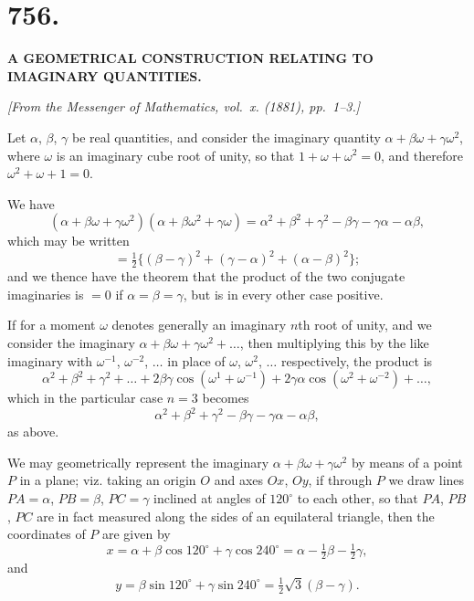 \documentclass[12pt,a4paper]{article}
\begin{document}
\newpage


\section*{756.}

\begin{center}
\textbf{A GEOMETRICAL CONSTRUCTION RELATING TO IMAGINARY QUANTITIES.}
\end{center}

\begin{flushright}
\textit{[From the Messenger of Mathematics, vol.~x. (1881), pp.~1--3.]}
\end{flushright}

Let $\alpha$, $\beta$, $\gamma$ be real quantities, and consider the imaginary quantity
$\alpha + \beta\omega + \gamma\omega^2$, where $\omega$ is an imaginary cube root of unity, so that
$1 + \omega + \omega^2 = 0$, and therefore $\omega^2 + \omega + 1 = 0$.

We have
%
\[
(\alpha + \beta\omega + \gamma\omega^2)
(\alpha + \beta\omega^2 + \gamma\omega)
= \alpha^2 + \beta^2 + \gamma^2 - \beta\gamma - \gamma\alpha - \alpha\beta,
\]
%
which may be written
%
\[
= \tfrac{1}{2} \{ (\beta-\gamma)^2 + (\gamma-\alpha)^2 + (\alpha-\beta)^2 \};
\]
%
and we thence have the theorem that the product of the two conjugate
imaginaries is $=0$ if $\alpha = \beta = \gamma$, but is in every other case positive.

If for a moment $\omega$ denotes generally an imaginary $n$th root of unity, and
we consider the imaginary $\alpha + \beta\omega + \gamma\omega^2 + \ldots$, then multiplying this by
the like imaginary with $\omega^{-1}$, $\omega^{-2}$, $\ldots$ in place of $\omega$, $\omega^2$, $\ldots$ respectively,
the product is
%
\[
\alpha^2 + \beta^2 + \gamma^2 + \ldots
+ 2\beta\gamma \cos(\omega^1 + \omega^{-1})
+ 2\gamma\alpha \cos(\omega^2 + \omega^{-2})
+ \ldots,
\]
%
which in the particular case $n=3$ becomes
%
\[
\alpha^2 + \beta^2 + \gamma^2 - \beta\gamma - \gamma\alpha - \alpha\beta,
\]
%
as above.

We may geometrically represent the imaginary $\alpha + \beta\omega + \gamma\omega^2$
by means of a point $P$ in a plane; viz. taking an origin $O$ and
axes $Ox$, $Oy$, if through $P$ we draw lines $PA = \alpha$, $PB = \beta$, $PC = \gamma$
inclined at angles of $120^{\circ}$ to each other, so that $PA$, $PB$, $PC$ are in fact
measured along the sides of an equilateral triangle, then the coordinates of $P$
are given by
%
\[
x = \alpha + \beta\cos 120^{\circ} + \gamma\cos 240^{\circ}
= \alpha - \tfrac{1}{2}\beta - \tfrac{1}{2}\gamma,
\]
and
%
\[
y = \beta\sin 120^{\circ} + \gamma\sin 240^{\circ}
= \tfrac{1}{2}\sqrt{3}(\beta - \gamma).
\]
\end{document}

